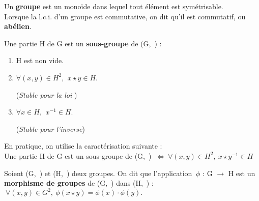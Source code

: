 \vspace{1.4cm}

Un \textbf{groupe} est un monoïde dans lequel tout élément est symétrisable.\vspace{0.1cm} \\
Lorsque la l.c.i. d'un groupe est commutative, on dit qu'il est commutatif, ou \textbf{abélien}.

\vspace{1cm}

\noindent Une partie H de G est un \textbf{sous-groupe} de (G,\ \lci) \ssi :\vspace{-0.1cm}
\begin{enumerate}[leftmargin=2cm]
    \item H est non vide.\vspace{0.1cm}

    \item \(\forall(x,y)\in H^2,\ \, x\star y\in H \). \hspace{0.3cm}
    \begin{small}
        (\emph{Stable pour la loi \lci})
    \end{small}\vspace{0.1cm}

    \item \(\forall x\in H,\ \,x^{-1}\in H \). \hspace{1.4cm}
    \begin{small}
        (\emph{Stable pour l'inverse})
    \end{small}
\end{enumerate}

\vspace{0.5cm}
\begin{small}
\noindent En pratique, on utilise la caractérisation suivante : \vspace{0.1cm} \\
Une partie H de G est un sous-groupe de (G,\ \lci) \(\ \Leftrightarrow \ \forall (x,y)\in H^2,\ x\star y^{-1}\in H\)\end{small}

\vspace{1cm}

Soient (G,\ \lci) et (H,\ \lce) deux groupes. On dit que l'application \(\ \phi\) : G \(\to\) H est un \textbf{morphisme de groupes} de (G,\ \lci) dans (H,\ \lce) \ssi : \(\ \forall(x,y)\in G^2,\ \phi(x\star y)=\phi(x)\cdot \phi(y). \)

\vspace{0.1cm}

